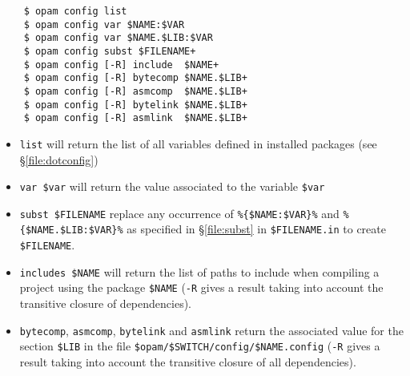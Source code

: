 \documentclass[a4paper,10pt]{article}
\begin{document}
\begin{verbatim}
    $ opam config list
    $ opam config var $NAME:$VAR
    $ opam config var $NAME.$LIB:$VAR
    $ opam config subst $FILENAME+
    $ opam config [-R] include  $NAME+
    $ opam config [-R] bytecomp $NAME.$LIB+
    $ opam config [-R] asmcomp  $NAME.$LIB+
    $ opam config [-R] bytelink $NAME.$LIB+
    $ opam config [-R] asmlink  $NAME.$LIB+
\end{verbatim}

\begin{itemize}
\item \verb+list+ will return the list of all variables defined
  in installed packages (see \S\ref{file:dotconfig})
\item \verb+var $var+ will return the value associated to the
  variable \verb+$var+
\item \verb+subst $FILENAME+ replace any occurrence of
  \verb+%{$NAME:$VAR}%+ and \verb+%{$NAME.$LIB:$VAR}%+ as specified in
  \S\ref{file:subst} in \verb+$FILENAME.in+ to create \verb+$FILENAME+.
\item \verb+includes $NAME+ will return the list of paths to include when
  compiling a project using the package \verb+$NAME+ (\verb+-R+ gives
  a result taking into account the transitive closure of
  dependencies).
\item \verb+bytecomp+, \verb+asmcomp+, \verb+bytelink+ and
  \verb+asmlink+ return the associated value for the section
  \verb+$LIB+ in the file \verb+$opam/$SWITCH/config/$NAME.config+ (\verb+-R+ gives
  a result taking into account the transitive closure of all
  dependencies).
\end{itemize}
\end{document}
